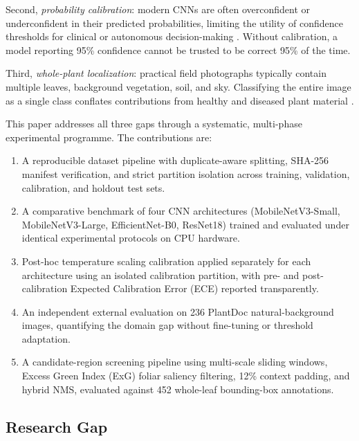 \documentclass[pdflatex,sn-mathphys-num]{sn-jnl}
\theoremstyle{thmstyleone}%
\theoremstyle{thmstyletwo}%
\theoremstyle{thmstylethree}%
\begin{document}
Second, \textit{probability calibration}: modern CNNs are often overconfident or
underconfident in their predicted probabilities, limiting the utility of confidence
thresholds for clinical or autonomous decision-making \citep{guo2017calibration,minderer2021calibration}.
Without calibration, a model reporting 95\% confidence cannot be trusted to be correct
95\% of the time.

Third, \textit{whole-plant localization}: practical field photographs typically contain
multiple leaves, background vegetation, soil, and sky. Classifying the entire image as a
single class conflates contributions from healthy and diseased plant material
\citep{barbedo2018factors,ren2015fasterrcnn}.

This paper addresses all three gaps through a systematic, multi-phase experimental
programme. The contributions are:

\begin{enumerate}
  \item A reproducible dataset pipeline with duplicate-aware splitting, SHA-256 manifest
        verification, and strict partition isolation across training, validation,
        calibration, and holdout test sets.
  \item A comparative benchmark of four CNN architectures (MobileNetV3-Small,
        MobileNetV3-Large, EfficientNet-B0, ResNet18) trained and evaluated under
        identical experimental protocols on CPU hardware.
  \item Post-hoc temperature scaling calibration applied separately for each architecture
        using an isolated calibration partition, with pre- and post-calibration Expected
        Calibration Error (ECE) reported transparently.
  \item An independent external evaluation on 236 PlantDoc natural-background images,
        quantifying the domain gap without fine-tuning or threshold adaptation.
  \item A candidate-region screening pipeline using multi-scale sliding windows, Excess
        Green Index (ExG) foliar saliency filtering, 12\% context padding, and hybrid
        NMS, evaluated against 452 whole-leaf bounding-box annotations.
\end{enumerate}

\subsection{Research Gap}
\label{sec:research_gap}
\end{document}
